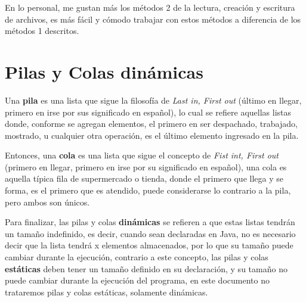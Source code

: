 En lo personal, me gustan más los métodos 2 de la lectura, creación y escritura de archivos, es más fácil y cómodo trabajar con estos métodos a diferencia de los métodos 1 descritos.



\section{Pilas y Colas dinámicas}
\hspace{0.55cm}Una \textbf{pila} es una lista que sigue la filosofía de \textit{Last in, First out} (último en llegar, primero en irse por sus significado en español), lo cual se refiere aquellas listas donde, conforme se agregan elementos, el primero en ser despachado, trabajado, mostrado, u cualquier otra operación, es el último elemento ingresado en la pila.

Entonces, una \textbf{cola} es una lista que sigue el concepto de \textit{Fist int, First out} (primero en llegar, primero en irse por su significado en español), una cola es aquella típica fila de supermercado o tienda, donde el primero que llega y se forma, es el primero que es atendido, puede considerarse lo contrario a la pila, pero ambos son únicos.

Para finalizar, las pilas y colas \textbf{dinámicas} se refieren a que estas listas tendrán un tamaño indefinido, es decir, cuando sean declaradas en Java, no es necesario decir que la lista tendrá x elementos almacenados, por lo que su tamaño puede cambiar durante la ejecución, contrario a este concepto, las pilas y colas \textbf{estáticas} deben tener un tamaño definido en su declaración, y su tamaño no puede cambiar durante la ejecución del programa, en este documento no trataremos pilas y colas estáticas, solamente dinámicas.


